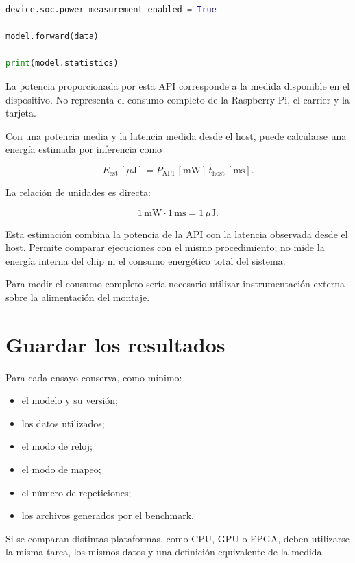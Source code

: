 \begin{lstlisting}[language=Python]
device.soc.power_measurement_enabled = True

model.forward(data)

print(model.statistics)
\end{lstlisting}

La potencia proporcionada por esta API corresponde a la medida disponible en el dispositivo.
No representa el consumo completo de la Raspberry Pi, el carrier y la tarjeta.

Con una potencia media y la latencia medida desde el host, puede calcularse
una energía estimada por inferencia como

\begin{equation}
  E_{\mathrm{est}} \,[\mu\mathrm{J}]
  =
  P_{\mathrm{API}} \,[\mathrm{mW}]
  \,
  t_{\mathrm{host}} \,[\mathrm{ms}].
\end{equation}

La relación de unidades es directa:

\[
1\,\mathrm{mW}\cdot 1\,\mathrm{ms}
=
1\,\mu\mathrm{J}.
\]

Esta estimación combina la potencia de la API con la latencia observada desde el host.
Permite comparar ejecuciones con el mismo procedimiento; no mide la energía interna
del chip ni el consumo energético total del sistema.

Para medir el consumo completo sería necesario utilizar instrumentación externa sobre la
alimentación del montaje.

\section{Guardar los resultados}

Para cada ensayo conserva, como mínimo:

\begin{itemize}
  \item el modelo y su versión;
  \item los datos utilizados;
  \item el modo de reloj;
  \item el modo de mapeo;
  \item el número de repeticiones;
  \item los archivos generados por el benchmark.
\end{itemize}

Si se comparan distintas plataformas, como CPU, GPU o FPGA, deben utilizarse la misma tarea,
los mismos datos y una definición equivalente de la medida.

